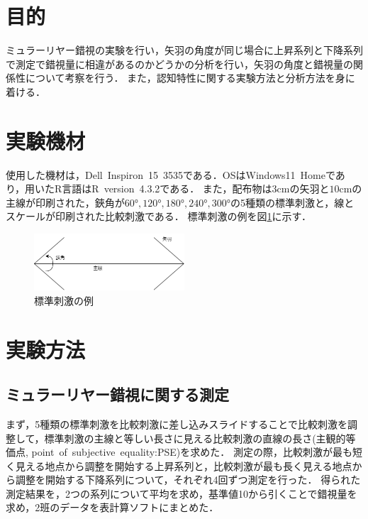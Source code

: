 \documentclass{jlreq}
\numberwithin{equation}{section}
\begin{document}
\tableofcontents
\clearpage

\section{目的}
ミュラーリヤー錯視の実験を行い，矢羽の角度が同じ場合に上昇系列と下降系列で測定で錯視量に相違があるのかどうかの分析を行い，矢羽の角度と錯視量の関係性について考察を行う．
また，認知特性に関する実験方法と分析方法を身に着ける．

\section{実験機材}
使用した機材は，Dell\ Inspiron\ 15\ 3535である．OSはWindows11\ Homeであり，用いたR言語はR\ version\ 4.3.2である．
また，配布物は$3\si{\cm}$の矢羽と$10\si{\cm}$の主線が印刷された，鋏角が$60\si{\degree}, 120\si{\degree}, 180\si{\degree}, 240\si{\degree}, 300\si{\degree}$の5種類の標準刺激と，線とスケールが印刷された比較刺激である．
標準刺激の例を図\ref{fig:std_stim}に示す．

\begin{figure}[H]
  \centering
  \includegraphics[width=0.5\textwidth]{image/ミュラーリヤー錯視.png}
  \caption{標準刺激の例}
  \label{fig:std_stim}
\end{figure}

\section{実験方法}
\subsection{ミュラーリヤー錯視に関する測定}
まず，5種類の標準刺激を比較刺激に差し込みスライドすることで比較刺激を調整して，標準刺激の主線と等しい長さに見える比較刺激の直線の長さ(主観的等価点, point\ of\ subjective\ equality:PSE)を求めた．
測定の際，比較刺激が最も短く見える地点から調整を開始する上昇系列と，比較刺激が最も長く見える地点から調整を開始する下降系列について，それぞれ4回ずつ測定を行った．
得られた測定結果を，2つの系列について平均を求め，基準値10から引くことで錯視量を求め，2班のデータを表計算ソフトにまとめた．
\end{document}
